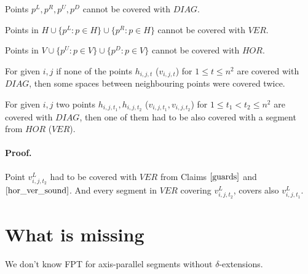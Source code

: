 \begin{claim}
\label{guards}
Points $p^{L}, p^R, p^U, p^D$ cannot be covered with $DIAG$.
\end{claim}

\begin{claim}
\label{hor_ver_sound}
Points in $H \cup \{p^L : p \in H\} \cup \{p^R : p \in H\}$
cannot be covered with $VER$.

Points in $V \cup \{p^U : p \in V\} \cup \{p^D : p \in V\} $
cannot be covered with $HOR$.
\end{claim}

\begin{claim}
For given $i, j$ if none of the points $h_{i, j, t}$ ($v_{i, j, t}$)
for $1 \le t \le n^2$ are covered with $DIAG$,
then some spaces between neighbouring points were covered twice.
\end{claim}

\begin{claim}
For given $i, j$ two points $h_{i, j, t_1}, h_{i, j, t_2}$
($v_{i, j, t_1}, v_{i, j, t_2}$)
for $1 \le t_1 < t_2 \le n^2$ are covered with $DIAG$,
then one of them had to be also covered with a segment from $HOR$
($VER$).
\end{claim}
\paragraph{Proof.}
Point $v^L_{i, j, t_2}$ had to be covered with $VER$
from Claims $\ref{guards}$ and $\ref{hor_ver_sound}$.
And every segment in $VER$ covering $v^L_{i, j, t_2}$,
covers also $v^L_{i, j, t_1}$.


\section{What is missing}
We don't know FPT for axis-parallel segments without $\delta$-extensions.
